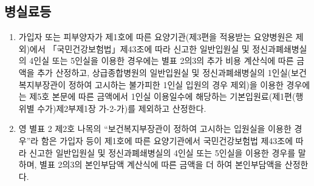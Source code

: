 \subsection{병실료등}
\begin{myshadowbox}
\begin{enumerate}[8.]\tightlist
\item 가입자 또는 피부양자가 제1호에 따른 요양기관(제3편을 적용받는 요양병원은 제외)에서 「국민건강보험법」제43조에 따라 신고한 일반입원실 및 정신과폐쇄병실의 4인실 또는 5인실을 이용한 경우에는 별표 2의3의 추가 비용 계산식에 따른 금액을 추가 산정하고, 상급종합병원의 일반입원실 및 정신과폐쇄병실의 1인실(보건복지부장관이 정하여 고시하는 불가피한 1인실 입원의 경우 제외)을 이용한 경우에는 제5호 본문에 따른 금액에서 1인실 이용일수에 해당하는 기본입원료(제1편(행위별 수가)제2부제1장 가-2-가)를 제외하고 산정한다.
\item 영 별표 2 제2호 나목의 “보건복지부장관이 정하여 고시하는 입원실을 이용한 경우”라 함은 가입자 등이 제1호에 따른 요양기관에서 국민건강보험법 제43조에 따라 신고한 일반입원실 및 정신과폐쇄병실의 4인실 또는 5인실을 이용한 경우를 말하며, 별표 2의3의 본인부담액 계산식에 따른 금액을 더 하여 본인부담액을 산정한다.
\end{enumerate}
\end{myshadowbox}
\prezi{\clearpage}
\prezi{\clearpage}
\par
\medskip
{}
\prezi{\clearpage}
\par
\medskip
{}
